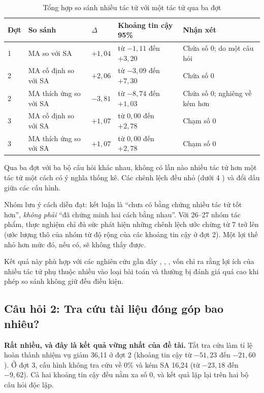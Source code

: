 \begin{table}[!htbp]
\caption{Tổng hợp so sánh nhiều tác tử với một tác tử qua ba đợt}
\label{tab:tong-ket-ch1}
\cobang
\begin{tabularx}{\linewidth}{P{1.5cm}P{3.6cm}R{1.4cm}P{3.3cm}Y}
\toprule
\textbf{Đợt} & \textbf{So sánh} & \textbf{$\Delta$} & \textbf{Khoảng tin cậy 95\%} & \textbf{Nhận xét}\\
 & MA so với SA & $+1{,}04$ & từ $-1{,}11$ đến $+3{,}20$ & Chứa số 0; do một câu hỏi\\
2 & MA cố định so với SA & $+2{,}06$ & từ $-3{,}09$ đến $+7{,}30$ & Chứa số 0\\
2 & MA thích ứng so với SA & $-3{,}81$ & từ $-8{,}74$ đến $+1{,}03$ & Chứa số 0; nghiêng về kém hơn\\
3 & MA cố định so với SA & $+1{,}07$ & từ $0{,}00$ đến $+2{,}78$ & Chạm số 0\\
3 & MA thích ứng so với SA & $+1{,}07$ & từ $0{,}00$ đến $+2{,}78$ & Chạm số 0\\
\bottomrule
\end{tabularx}
\end{table}

Qua ba đợt với ba bộ câu hỏi khác nhau, không có lần nào nhiều tác tử hơn một tác tử một cách có ý nghĩa thống kê. Các chênh lệch đều nhỏ (dưới 4 \pp) và đổi dấu giữa các cấu hình.

Nhóm lưu ý cách diễn đạt: kết luận là ``chưa có bằng chứng nhiều tác tử tốt hơn'', \emph{không phải} ``đã chứng minh hai cách bằng nhau''. Với 26--27 nhóm tác phẩm, thực nghiệm chỉ đủ sức phát hiện những chênh lệch ước chừng từ 7 \pp{} trở lên (ước lượng thô của nhóm từ độ rộng của các khoảng tin cậy ở đợt 2). Một lợi thế nhỏ hơn mức đó, nếu có, sẽ không thấy được.

Kết quả này phù hợp với các nghiên cứu gần đây , , , vốn chỉ ra rằng lợi ích của nhiều tác tử phụ thuộc nhiều vào loại bài toán và thường bị đánh giá quá cao khi phép so sánh không giữ đều điều kiện.

\subsection{Câu hỏi 2: Tra cứu tài liệu đóng góp bao nhiêu?}

\textbf{Rất nhiều, và đây là kết quả vững nhất của đề tài.} Tắt tra cứu làm tỉ lệ hoàn thành nhiệm vụ giảm 36,11 \pp{} ở đợt 2 (khoảng tin cậy từ $-51{,}23$ đến $-21{,}60$). Ở đợt 3, cấu hình không tra cứu về 0\% và kém SA 16,24 \pp{} (từ $-23{,}18$ đến $-9{,}62$). Cả hai khoảng tin cậy đều nằm xa số 0, và kết quả lặp lại trên hai bộ câu hỏi độc lập.

